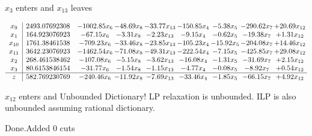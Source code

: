 \documentclass[8pt]{article}
\begin{document}
 $ x_{3} $ enters and $ x_{13} $ leaves 

 \[\begin{array}{c| c c@{\hskip 2pt} c@{\hskip 2pt} c@{\hskip 2pt} c@{\hskip 2pt} c@{\hskip 2pt} c@{\hskip 2pt} c@{\hskip 2pt} }
 x_{9}   &  2493.07692308 & -1002.85 x_{6} & -48.69 x_{8} & -33.77 x_{13} & -150.85 x_{4} & -5.38 x_{5} & -290.62 x_{7} & + 20.69 x_{12}\\
 x_{1}   &  164.923076923 & -67.15 x_{6} & -3.31 x_{8} & -2.23 x_{13} & -9.15 x_{4} & -0.62 x_{5} & -19.38 x_{7} & +  1.31 x_{12}\\
 x_{10}   &  1761.38461538 & -709.23 x_{6} & -33.46 x_{8} & -23.85 x_{13} & -105.23 x_{4} & -15.92 x_{5} & -204.08 x_{7} & + 14.46 x_{12}\\
 x_{11}   &  3642.23076923 & -1462.54 x_{6} & -71.08 x_{8} & -49.31 x_{13} & -222.54 x_{4} & -7.15 x_{5} & -425.85 x_{7} & + 29.08 x_{12}\\
 x_{2}   &  268.461538462 & -107.08 x_{6} & -5.15 x_{8} & -3.62 x_{13} & -16.08 x_{4} & -1.31 x_{5} & -31.69 x_{7} & +  2.15 x_{12}\\
 x_{3}   &  80.6153846154 & -31.77 x_{6} & -1.54 x_{8} & -1.15 x_{13} & -4.77 x_{4} & -0.08 x_{5} & -8.92 x_{7} & +  0.54 x_{12}\\
\hline
z    &  582.769230769 & -240.46 x_{6} & -11.92 x_{8} & -7.69 x_{13} & -33.46 x_{4} & -1.85 x_{5} & -66.15 x_{7} & +  4.92 x_{12}\\
\end{array}\]


 $ x_{12} $ enters and Unbounded Dictionary!
 LP relaxation is unbounded. ILP is also unbounded assuming rational dictionary. 

Done.Added 0 cuts 
\end{document}
